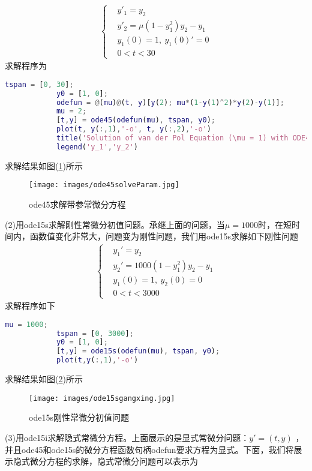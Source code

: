 	        \begin{align*}
			\left\{
			\begin{aligned}
			& y'_1 = y_2\\
			& y'_2 = \mu (1-y_1^2) y_2 - y_1\\
			& y_1(0)=1,\ y_1(0)'=0\\
			& 0<t<30
			\end{aligned}
			\right.
	        \end{align*}
	        求解程序为
	        \begin{lstlisting}[language = Matlab]
			tspan = [0, 30];
			y0 = [1, 0];
			odefun = @(mu)@(t, y)[y(2); mu*(1-y(1)^2)*y(2)-y(1)];
			mu = 2;
			[t,y] = ode45(odefun(mu), tspan, y0);
			plot(t, y(:,1),'-o', t, y(:,2),'-o')
			title('Solution of van der Pol Equation (\mu = 1) with ODE45');
			legend('y_1','y_2')
	        \end{lstlisting}
	        求解结果如图(\ref{ode45求解带参常微分方程})所示
			\begin{figure}[H]
	        \centering
	        \texttt{[image: images/ode45solveParam.jpg]}
	        \caption{ode45求解带参常微分方程}
	        \label{ode45求解带参常微分方程}
	        \end{figure}
	        (2)用ode15s求解刚性常微分初值问题。承继上面的问题，当$\mu=1000$时，在短时间内，函数值变化非常大，问题变为刚性问题，我们用ode15s求解如下刚性问题
	        \begin{align*}
			\left\{
			\begin{aligned}
			& y_1' = y_2\\
			& y_2' = 1000(1-y_1^2)y_2-y_1\\
			& y_1(0)=1,\ y_2(0)=0\\
			& 0<t<3000
			\end{aligned}
			\right.
	        \end{align*}
	        求解程序如下
	        \begin{lstlisting}[language = Matlab]
			mu = 1000;
			tspan = [0, 3000];
			y0 = [1, 0];
			[t,y] = ode15s(odefun(mu), tspan, y0);
			plot(t,y(:,1),'-o')
	        \end{lstlisting}
	        求解结果如图(\ref{ode15s刚性常微分初值问题})所示
			\begin{figure}[H]
	        \centering
	        \texttt{[image: images/ode15sgangxing.jpg]}
	        \caption{ode15s刚性常微分初值问题}
	        \label{ode15s刚性常微分初值问题}
	        \end{figure}
	        (3)用ode15i求解隐式常微分方程。上面展示的是显式常微分问题：$y'=(t,y)$ ，并且ode45和ode15s的微分方程函数句柄odefun要求方程为显式。下面，我们将展示隐式微分方程的求解，隐式常微分问题可以表示为
